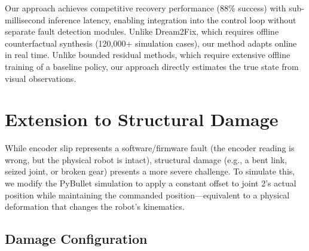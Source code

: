 ﻿\documentclass[12pt,a4paper,oneside]{report}
\begin{document}
\begin{table}[H]
\centering
\caption{Comparison to fault-tolerant control methods in the literature.}
\label{tab:comparison_fault}
\end{table}

Our approach achieves competitive recovery performance (88\% success) with sub-millisecond inference latency, enabling integration into the control loop without separate fault detection modules. Unlike Dream2Fix, which requires offline counterfactual synthesis (120,000+ simulation cases), our method adapts online in real time. Unlike bounded residual methods, which require extensive offline training of a baseline policy, our approach directly estimates the true state from visual observations.

\section{Extension to Structural Damage}

While encoder slip represents a software/firmware fault (the encoder reading is wrong, but the physical robot is intact), structural damage (e.g., a bent link, seized joint, or broken gear) presents a more severe challenge. To simulate this, we modify the PyBullet simulation to apply a constant offset to joint 2's actual position while maintaining the commanded position---equivalent to a physical deformation that changes the robot's kinematics.

\subsection{Damage Configuration}
\end{document}
